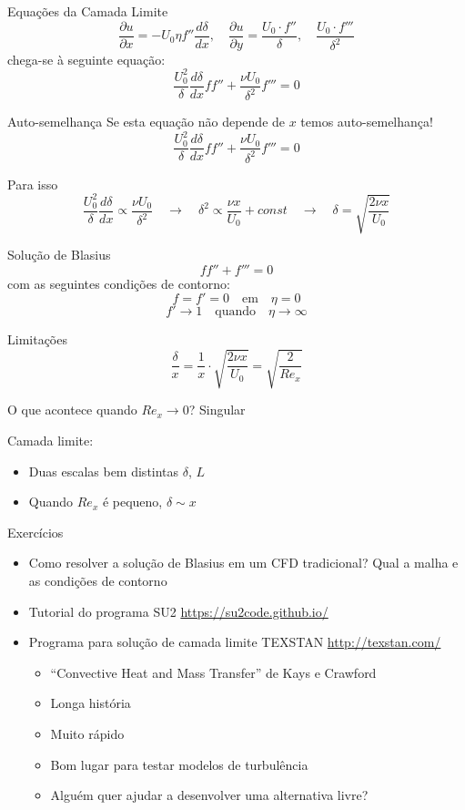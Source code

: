 \documentclass{beamer}
\newcommand{\lra}{\ensuremath{\longrightarrow}}
\newcommand{\qrq}{\ensuremath{\quad\lra\quad}}
\begin{document}
\begin{frame}{Equações da Camada Limite}
  \[
\frac{\partial u}{\partial x} = -U_0\eta f'' \frac{d\delta}{dx}, 
\quad \frac{\partial u}{\partial y} = \frac{U_0 \cdot f''}{\delta}, \quad \frac{U_0 \cdot f'''}{\delta^2}
\]
chega-se à seguinte equação:
\[
\frac{U_0^2}{\delta}\frac{d\delta}{dx} ff'' + \frac{\nu U_0}{\delta^2}f''' = 0
\]
\end{frame}

\begin{frame}{Auto-semelhança}
Se esta equação não depende de $x$ temos auto-semelhança!
  \[
\frac{U_0^2}{\delta}\frac{d\delta}{dx} ff'' + \frac{\nu U_0}{\delta^2}f''' = 0
\]

Para isso
  \[
\frac{U_0^2}{\delta}\frac{d\delta}{dx} \propto \frac{\nu U_0}{\delta^2} \qrq \delta^2 \propto \frac{\nu x}{U_0} + const \qrq \delta = \sqrt{\frac{2 \nu x}{U_0}}
\]

\end{frame}

\begin{frame}{Solução de Blasius}
  \[
ff'' + f''' = 0
\]
com as seguintes condições de contorno:
\[
f = f' = 0 \quad\text{em}\quad \eta = 0
\]
\[
f' \lra 1 \quad\text{quando}\quad \eta\lra\infty
\]

\end{frame}

\begin{frame}{Limitações}
  \[
\frac{\delta}{x} = \frac{1}{x}\cdot \sqrt{\frac{2 \nu x}{U_0}} = \sqrt{\frac{2}{Re_x}}
\]

O que acontece quando $Re_x\to 0$? Singular

Camada limite:
\begin{itemize}
\item Duas escalas bem distintas $\delta$, $L$
\item Quando $Re_x$ é pequeno, $\delta \sim x$
\end{itemize}

\end{frame}

\begin{frame}{Exercícios}
  \begin{itemize}
  \item Como resolver a solução de Blasius em um CFD tradicional? Qual a malha e as condições de contorno
  \item Tutorial do programa SU2 \url{https://su2code.github.io/}
  \item Programa para solução de camada limite TEXSTAN \url{http://texstan.com/}
    \begin{itemize}
    \item ``Convective Heat and Mass Transfer'' de Kays e Crawford
    \item Longa história
    \item Muito rápido
    \item Bom lugar para testar modelos de turbulência
    \item Alguém quer ajudar a desenvolver uma alternativa livre?
    \end{itemize}
  \end{itemize}
  
\end{frame}
\end{document}

